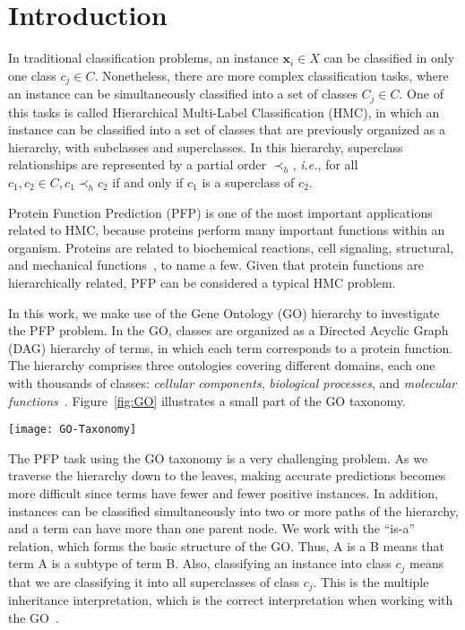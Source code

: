 \section{Introduction}

In traditional classification problems, an instance $\mathbf{x}_i \in X$ can be classified in only one class $c_j \in C$. Nonetheless, there are more complex classification tasks, where an instance can be simultaneously classified into a set of classes $C_j \in C$. One of this tasks is called Hierarchical Multi-Label Classification (HMC), in which an instance can be classified into a set of classes that are previously organized as a hierarchy, with subclasses and superclasses. In this hierarchy, superclass relationships are represented by a partial order $\prec_h$, \emph{i.e.}, for all $c_1, c_2 \in C, c_1 \prec_h c_2$ if and only if $c_1$ is a superclass of $c_2$.

Protein Function Prediction (PFP) is one of the most important applications related to HMC, because proteins perform many important functions within an organism. Proteins are related to biochemical reactions, cell signaling, structural, and mechanical functions~\cite{Costa2008}, to name a few. Given that protein functions are hierarchically related, PFP can be considered a typical HMC problem.

In this work, we make use of the Gene Ontology (GO) hierarchy to investigate the PFP problem. In the GO, classes are organized as a Directed Acyclic Graph (DAG) hierarchy of terms, in which each term corresponds to a protein function. The hierarchy comprises three ontologies covering different domains, each one with thousands of classes: {\it cellular components}, {\it biological processes}, and {\it molecular functions}~\cite{Ashburner2000}. Figure~\ref{fig:GO} illustrates a small part of the GO taxonomy.

\begin{figure*}[ht]
    \centering
    \texttt{[image: GO-Taxonomy]}
    \caption{Part of the Gene Ontology Hierarchical Taxonomy. (Adapted from Ashburner et. al. \cite{Ashburner2000})}
    \label{fig:GO}
\end{figure*}

The PFP task using the GO taxonomy is a very challenging problem. As we traverse the hierarchy down to the leaves, making accurate predictions becomes more difficult since terms have fewer and fewer positive instances. In addition, instances can be classified simultaneously into two or more paths of the hierarchy, and a term can have more than one parent node. We work with the ``is-a'' relation, which forms the basic structure of the GO. Thus, A is a B means that term A is a subtype of term B. Also, classifying an instance into class $c_j$ means that we are classifying it into all superclasses of class $c_j$. This is the multiple inheritance interpretation, which is the correct interpretation when working with the GO~\cite{Ashburner2000}.

